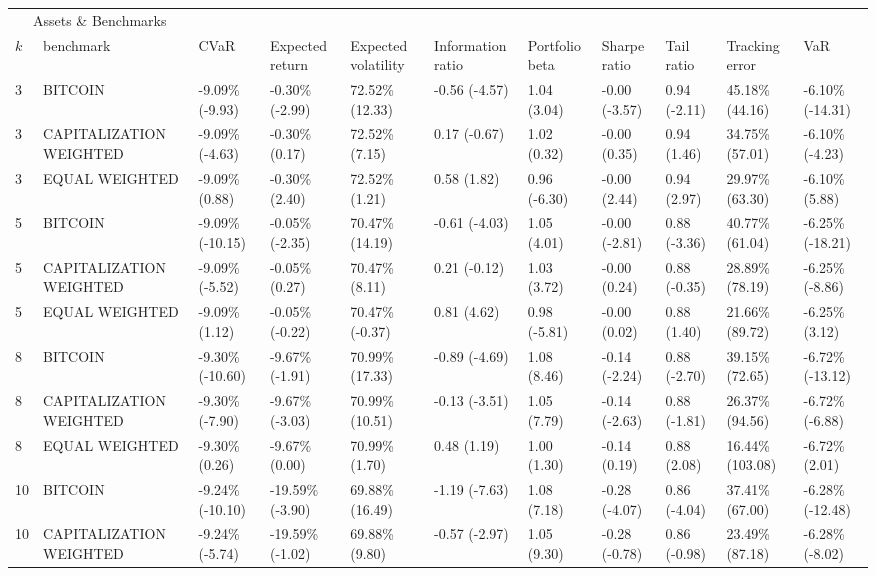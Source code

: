 \documentclass{article}
\begin{document}
\begin{landscape}
\begin{table}[H]
  \centering
  \begin{tabular}{p{0.4cm}|p{3cm}|p{1.65cm}|p{1.65cm}|p{1.65cm}|p{1.65cm}|p{1.65cm}|p{1.65cm}|p{1.65cm}|p{1.65cm}|p{1.65cm}}%
    \toprule
    \multicolumn{2}{c}{Assets \& Benchmarks}                   \\
    \cmidrule(r){1-2}
    $k$ & benchmark & CVaR & Expected return & Expected volatility&Information ratio&Portfolio beta&Sharpe ratio&Tail ratio&Tracking error&VaR\\
    \midrule 
3&BITCOIN&-9.09\% (-9.93)&-0.30\% (-2.99)&72.52\% (12.33)&-0.56 (-4.57)&1.04 (3.04)&-0.00 (-3.57)&0.94 (-2.11)&45.18\% (44.16)&-6.10\% (-14.31)
\\ 
3&CAPITALIZATION WEIGHTED&-9.09\% (-4.63)&-0.30\% (0.17)&72.52\% (7.15)&0.17 (-0.67)&1.02 (0.32)&-0.00 (0.35)&0.94 (1.46)&34.75\% (57.01)&-6.10\% (-4.23)
\\ 
3&EQUAL WEIGHTED&-9.09\% (0.88)&-0.30\% (2.40)&72.52\% (1.21)&0.58 (1.82)&0.96 (-6.30)&-0.00 (2.44)&0.94 (2.97)&29.97\% (63.30)&-6.10\% (5.88)
\\ 
5&BITCOIN&-9.09\% (-10.15)&-0.05\% (-2.35)&70.47\% (14.19)&-0.61 (-4.03)&1.05 (4.01)&-0.00 (-2.81)&0.88 (-3.36)&40.77\% (61.04)&-6.25\% (-18.21)
\\ 
5&CAPITALIZATION WEIGHTED&-9.09\% (-5.52)&-0.05\% (0.27)&70.47\% (8.11)&0.21 (-0.12)&1.03 (3.72)&-0.00 (0.24)&0.88 (-0.35)&28.89\% (78.19)&-6.25\% (-8.86)
\\ 
5&EQUAL WEIGHTED&-9.09\% (1.12)&-0.05\% (-0.22)&70.47\% (-0.37)&0.81 (4.62)&0.98 (-5.81)&-0.00 (0.02)&0.88 (1.40)&21.66\% (89.72)&-6.25\% (3.12)
\\ 
8&BITCOIN&-9.30\% (-10.60)&-9.67\% (-1.91)&70.99\% (17.33)&-0.89 (-4.69)&1.08 (8.46)&-0.14 (-2.24)&0.88 (-2.70)&39.15\% (72.65)&-6.72\% (-13.12)
\\ 
8&CAPITALIZATION WEIGHTED&-9.30\% (-7.90)&-9.67\% (-3.03)&70.99\% (10.51)&-0.13 (-3.51)&1.05 (7.79)&-0.14 (-2.63)&0.88 (-1.81)&26.37\% (94.56)&-6.72\% (-6.88)
\\ 
8&EQUAL WEIGHTED&-9.30\% (0.26)&-9.67\% (0.00)&70.99\% (1.70)&0.48 (1.19)&1.00 (1.30)&-0.14 (0.19)&0.88 (2.08)&16.44\% (103.08)&-6.72\% (2.01)
\\ 
10&BITCOIN&-9.24\% (-10.10)&-19.59\% (-3.90)&69.88\% (16.49)&-1.19 (-7.63)&1.08 (7.18)&-0.28 (-4.07)&0.86 (-4.04)&37.41\% (67.00)&-6.28\% (-12.48)
\\ 
10&CAPITALIZATION WEIGHTED&-9.24\% (-5.74)&-19.59\% (-1.02)&69.88\% (9.80)&-0.57 (-2.97)&1.05 (9.30)&-0.28 (-0.78)&0.86 (-0.98)&23.49\% (87.18)&-6.28\% (-8.02)

\end{tabular}
\end{table}
\end{landscape}
\end{document}
